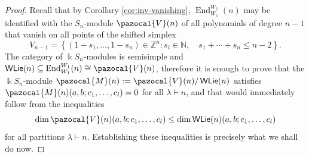 \documentclass[11pt,reqno]{amsart}
\theoremstyle{plain}
\theoremstyle{definition}
\theoremstyle{remark}
\newcommand{\bk}{\Bbbk}
\DeclareMathOperator{\WLie}{\mathsf{WLie}}
\DeclareMathOperator{\End}{End}
\def\calM{\pazocal{M}}
\def\calV{\pazocal{V}}
\begin{document}
\begin{proof}
Recall that by Corollary \ref{cor:inv-vanishing}, $\End_{W_1}^{W_1}(n)$ may be identified with the $S_n$-module $\calV(n)$ of all polynomials of degree $n-1$ that vanish on all points of the shifted simplex 
 \[
V_{n-1}=\left\{
(1-s_1,\ldots,1-s_n)\in\mathbb{Z}^n\colon 
s_i\in\mathbb{N},\quad s_1+\cdots+s_n\le n-2
\right\}.
 \]
The category of $\bk S_n$-modules is semisimple and $\WLie(n)\subseteq\End_{W_1}^{W_1}(n)\cong \calV(n)$, therefore it is enough to prove that the $\bk S_n$-module $\calM(n):=\calV(n)/\WLie(n)$ satisfies
$\calM(n)(a,b;c_1,\ldots,c_l)=0$ for all $\lambda\vdash n$, and that would immediately follow from the inequalities
\begin{equation}\label{eq:ineq-needed}
\dim\calV(n)(a,b;c_1,\ldots,c_l)\le \dim\WLie(n)(a,b;c_1,\ldots,c_l) 
\end{equation}
for all partitions $\lambda\vdash n$. Establishing these inequalities is precisely what we shall do now. 


\end{proof}
\end{document}
